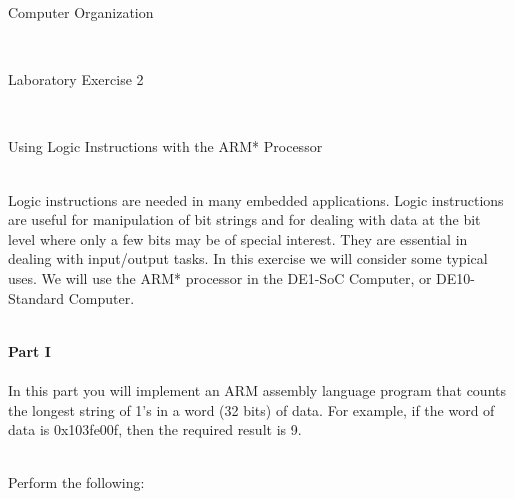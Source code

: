 \documentclass[epsfig,10pt,fullpage]{article}
\newcommand{\LabNum}{2}
\begin{document}
\centerline{\huge Computer Organization}
~\\
\centerline{\huge Laboratory Exercise \LabNum}
~\\
\centerline{\large Using Logic Instructions with the ARM* Processor}
~\\

\noindent
Logic instructions are needed in many embedded applications.  Logic instructions are useful 
for manipulation of bit strings and for dealing with data at the bit level where only a 
few bits may be of special interest. They are essential in dealing with input/output tasks.
In this exercise we will consider some typical uses. We will use the ARM* processor 
in the DE1-SoC Computer, or DE10-Standard Computer.

~\\
\noindent
{\bf Part I}
~\\
~\\
\noindent
In this part you will implement an ARM assembly language program that counts the longest 
string of 1's in a word (32 bits) of data. For example, if the word of data is {\sf 0x103fe00f},
then the required result is 9.

~\\
\noindent
Perform the following:
\end{document}
